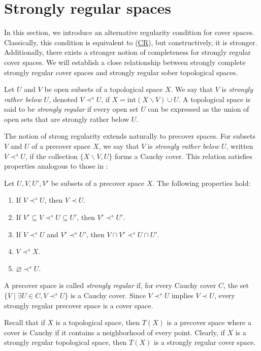 \documentclass[pdflatex,sn-mathphys-num]{sn-jnl}
\newcommand{\axref}[1]{(\hyperref[ax:#1]{#1})}
\theoremstyle{definition}
\theoremstyle{remark}
\numberwithin{figure}{section}
\newcommand{\rb}{\prec}
\begin{document}
\section{Strongly regular spaces}
\label{sec:strongly-regular}

In this section, we introduce an alternative regularity condition for cover spaces.
Classically, this condition is equivalent to \axref{CR}, but constructively, it is stronger.
Additionally, there exists a stronger notion of completeness for strongly regular cover spaces.
We will establish a close relationship between strongly complete strongly regular cover spaces and strongly regular sober topological spaces.

Let $U$ and $V$ be open subsets of a topological space $X$. We say that $V$ is \emph{strongly rather below} $U$, denoted $V \rb^s U$, if $X = \mathrm{int}(X \backslash V) \cup U$.
A topological space is said to be \emph{strongly regular} if every open set $U$ can be expressed as the union of open sets that are strongly rather below $U$.

The notion of strong regularity extends naturally to precover spaces.
For subsets $V$ and $U$ of a precover space $X$, we say that $V$ is \emph{strongly rather below} $U$, written $V \rb^s U$, if the collection $\{ X \backslash V, U \}$ forms a Cauchy cover.
This relation satisfies properties analogous to those in :

\begin{prop}
Let $U,V,U',V'$ be subsets of a precover space $X$. The following properties hold:
\begin{enumerate}
\item If $V \rb^s U$, then $V \rb U$.
\item If $V' \subseteq V \rb^s U \subseteq U'$, then $V' \rb^s U'$.
\item If $V \rb^s U$ and $V' \rb^s U'$, then $V \cap V' \rb^s U \cap U'$.
\item $V \rb^s X$.
\item $\varnothing \rb^s U$.
\end{enumerate}
\end{prop}

A precover space is called \emph{strongly regular} if, for every Cauchy cover $C$, the set $\{ V \mid \exists U \in C, V \rb^s U \}$ is a Cauchy cover.
Since $V \rb^s U$ implies $V \rb U$, every strongly regular precover space is a cover space.

\begin{example}
Recall that if $X$ is a topological space, then $T(X)$ is a precover space where a cover is Cauchy if it contains a neighborhood of every point.
Clearly, if $X$ is a strongly regular topological space, then $T(X)$ is a strongly regular cover space.
\end{example}
\end{document}
